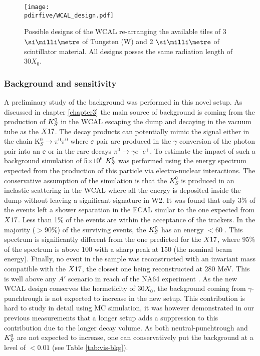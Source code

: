 \begin{figure}[tbh!]
  \centering
  \texttt{[image: \\pdirfive/WCAL\_design.pdf]}
  \caption[New WCAL design for 2021]{Possible designs of the WCAL re-arranging the available tiles of 3 $\mmi$ of Tungsten (W) and 2 $\mmi$ of scintillator material. All designs posses the same radiation length of 30$X_0$.}
  \label{fig:wcal-design}
\end{figure}


\subsubsection{Background and sensitivity}
\label{ch5:sec:background-sensitivity}

A preliminary study of the background was performed in this novel setup. As discussed in chapter \ref{chapter3} the main source of background is coming from the production of $K^0_S$ in the WCAL escaping the dump and decaying in the vacuum tube as the $X17$. The decay products can potentially mimic the signal either in the chain K$^0_S \rightarrow \pi^0 \pi^0$ where $\ee$ pair are produced in the $\gamma$ conversion of the photon pair into an $\ee$ or in the rare decays $\pi^0 \rightarrow \gamma e^- e^+$. To estimate the impact of such a background simulation of 5$\times 10^6$ $K^0_S$ was performed using the energy spectrum expected from the production of this particle via electro-nuclear interactions.
The conservative assumption of the simulation is that the $K^0_S$ is produced in an inelastic scattering in the WCAL where all the energy is deposited inside the dump without leaving a significant signature in W2. It was found that only 3\% of the events left a shower separation in the ECAL similar to the one expected from $X17$. Less than 1\% of the events are within the acceptance of the trackers. In the majority ($>$90\%) of the surviving events, the $K^0_S$ has an energy $<$60 \gev. This spectrum is significantly different from the one predicted for the $X17$, where 95\% of the spectrum is above 100 \gev with a sharp peak at 150 \gev (the nominal beam energy). Finally, no event in the sample was reconstructed with an invariant mass compatible with the $X17$, the closest one being reconstructed at 280 MeV. This is well above any $A'$ scenario in reach of the NA64 experiment \cite{Banerjee:2019hmi}. As the new WCAL design conserves the hermeticity of 30$X_0$, the background coming from $\gamma$-punchtrough is not expected to increase in the new setup. This contribution is hard to study in detail using MC simulation, it was however demonstrated in our previous measurements \cite{Banerjee:2019hmi} that a longer setup adds a suppression to this contribution due to the longer decay volume. As both neutral-punchtrough and $K^0_S$ are not expected to increase, one can conservatively put the background at a level of $<0.01$ (see Table \ref{tab:vis-bkg}).

